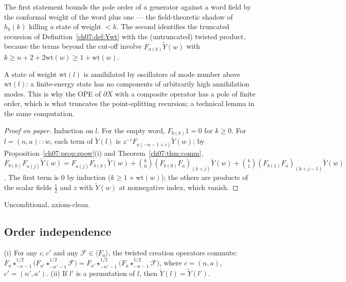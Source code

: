 \begin{dictionary}
The first statement bounds the pole order of a generator against a word field by the
conformal weight of the word plus one --- the field-theoretic shadow of $h_b(k)$ killing a state
of weight $<k$. The second identifies the truncated recursion of Definition~\ref{ch07:def:Ywt}
with the (untruncated) twisted product, because the terms beyond the cut-off involve
$F_{a(k)}\widetilde Y(w)$ with $k\ge n+2+2\mathrm{wt}(w)\ge1+\mathrm{wt}(w)$.
\end{dictionary}

\begin{physics}
A state of weight $\mathrm{wt}(l)$ is annihilated by oscillators of mode number above $\mathrm{wt}(l)$: a finite-energy state has no components of arbitrarily high annihilation modes. This is why the OPE of $\partial X$ with a composite operator has a pole of finite order, which is what truncates the point-splitting recursion; a technical lemma in the same computation.
\end{physics}

\begin{proof}[Proof on paper]
Induction on $l$. For the empty word, $F_{b(k)}1 = 0$ for $k\ge0$. For $l = (n,a)::w$, each term
of $\widetilde Y(l)$ is $z^{-i}F_{a(-n-1+i)}\widetilde Y(w)$; by
Proposition~\ref{ch07:prop:zpow}(i) and Theorem~\ref{ch07:thm:comm},
$F_{b(k)}F_{a(j)}\widetilde Y(w) = F_{a(j)}F_{b(k)}\widetilde Y(w) + \binom k0
(F_{b(0)}F_a)_{(k+j)}\widetilde Y(w) + \binom k1(F_{b(1)}F_a)_{(k+j-1)}\widetilde Y(w)$. The first
term is $0$ by induction ($k\ge1+\mathrm{wt}(w)$); the others are products of the scalar fields
$\frac12$ and $z$ with $\widetilde Y(w)$ at nonnegative index, which vanish.
\end{proof}

\begin{status}
Unconditional, axiom-clean.
\end{status}

\subsection{Order independence}

\begin{theorem}\label{ch07:thm:perm}
(i) For any $c, c'$ and any $\mathcal F\in\langle F_a\rangle$, the twisted creation operators
commute: $F_{a}\star^{1/2}_{-n-1}\bigl(F_{a'}\star^{1/2}_{-n'-1}\mathcal F\bigr) =
F_{a'}\star^{1/2}_{-n'-1}\bigl(F_{a}\star^{1/2}_{-n-1}\mathcal F\bigr)$, where $c=(n,a)$,
$c'=(n',a')$. (ii) If $l'$ is a permutation of $l$, then $\widetilde Y(l) = \widetilde Y(l')$.
\end{theorem}

